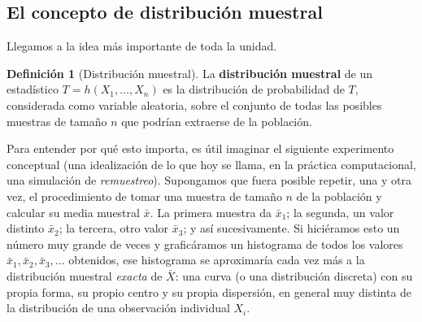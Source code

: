 \documentclass[11pt,a4paper]{article}
\theoremstyle{plain}
\theoremstyle{definition}
\newtheorem{definicion}[teorema]{Definición}
\theoremstyle{remark}
\begin{document}
\subsection{El concepto de distribución muestral}
\label{subsec:distribucion-muestral}

Llegamos a la idea más importante de toda la unidad.

\begin{definicion}[Distribución muestral]
La \textbf{distribución muestral} de un estadístico $T=h(X_1,\dots,X_n)$ es la distribución de probabilidad de $T$, considerada como variable aleatoria, sobre el conjunto de todas las posibles muestras de tamaño $n$ que podrían extraerse de la población.
\end{definicion}

Para entender por qué esto importa, es útil imaginar el siguiente experimento conceptual (una idealización de lo que hoy se llama, en la práctica computacional, una simulación de \emph{remuestreo}). Supongamos que fuera posible repetir, una y otra vez, el procedimiento de tomar una muestra de tamaño $n$ de la población y calcular su media muestral $\bar x$. La primera muestra da $\bar x_1$; la segunda, un valor distinto $\bar x_2$; la tercera, otro valor $\bar x_3$; y así sucesivamente. Si hiciéramos esto un número muy grande de veces y graficáramos un histograma de todos los valores $\bar x_1, \bar x_2, \bar x_3, \dots$ obtenidos, ese histograma se aproximaría cada vez más a la distribución muestral \emph{exacta} de $\bar X$: una curva (o una distribución discreta) con su propia forma, su propio centro y su propia dispersión, en general muy distinta de la distribución de una observación individual $X_i$.
\end{document}
